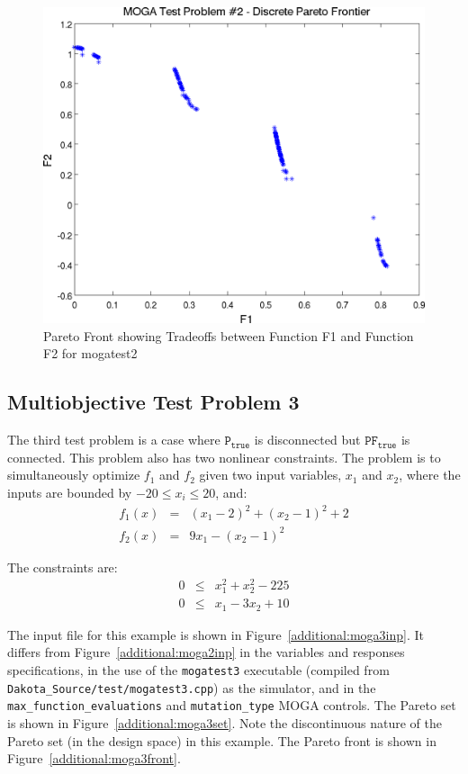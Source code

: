 \begin{figure}
  \centering
  \includegraphics[scale=0.75]{images/dakota_mogatest2_pareto_front}
  \caption{Pareto Front showing Tradeoffs between Function F1 and
    Function F2 for mogatest2}
  \label{additional:moga2front}
\end{figure}

\subsection{Multiobjective Test Problem 3}\label{additional:multiobjective:problem3}

The third test problem is a case where $\mathtt{P_{true}}$ is
disconnected but $\mathtt{PF_{true}}$ is connected.
This problem also has two
nonlinear constraints. The problem is to simultaneously optimize
$f_1$ and $f_2$ given two input variables, $x_1$ and $x_2$,
where the inputs are bounded by $-20 \leq x_{i} \leq 20$, and:
\begin{eqnarray*}
f_1(x) &=& (x_1-2)^2+(x_2-1)^2+2 \\
f_2(x) &=& 9x_1-(x_2-1)^2
\end{eqnarray*}

The constraints are:
\begin{eqnarray*}
0 &\leq& x_1^2+x_2^2-225 \\
0 &\leq& x_1-3x_2+10
\end{eqnarray*}

The input file for this example is shown in
Figure~\ref{additional:moga3inp}. It differs from
Figure~\ref{additional:moga2inp} in the variables and responses
specifications, in the use of the \texttt{mogatest3} executable
(compiled from \texttt{Dakota\_Source/test/mogatest3.cpp}) as the simulator, and
in the \texttt{max\_function\_evaluations} and \texttt{mutation\_type}
MOGA controls. The Pareto set is shown in
Figure~\ref{additional:moga3set}. Note the discontinuous nature of the
Pareto set (in the design space) in this example. The Pareto front is
shown in Figure~\ref{additional:moga3front}.


